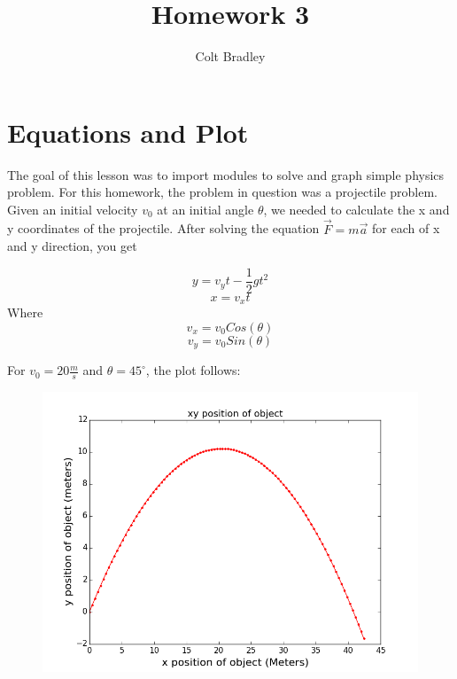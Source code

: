 \documentclass[11pt]{article}
\begin{document}
\title{Homework 3}
\author{Colt Bradley}
\date{}
\maketitle

\section{Equations and Plot}
The goal of this lesson was to import modules to solve and graph simple physics problem. For this homework, the problem in question was a projectile problem. Given an initial velocity $v_0$ at an initial angle $\theta$, we needed to calculate the x and y coordinates of the projectile. After solving the equation $\vec F = m\vec a$ for each of x and y direction, you get

\begin{equation}
y = v_y t - \frac{1}{2} g t^2
\end{equation}
\begin{equation}
x = v_x t
\end{equation}
Where
\begin{equation}
v_x = v_0 Cos(\theta)
\end{equation}
\begin{equation}
v_y = v_0 Sin(\theta)
\end{equation}

For $v_0 = 20 \frac{m}{s}$ and $\theta = 45^{\circ}$, the plot follows:
\begin{figure}[ht]
\centering
\includegraphics[scale=.4]{xy_projectile.png}
\end{figure}
\end{document}
